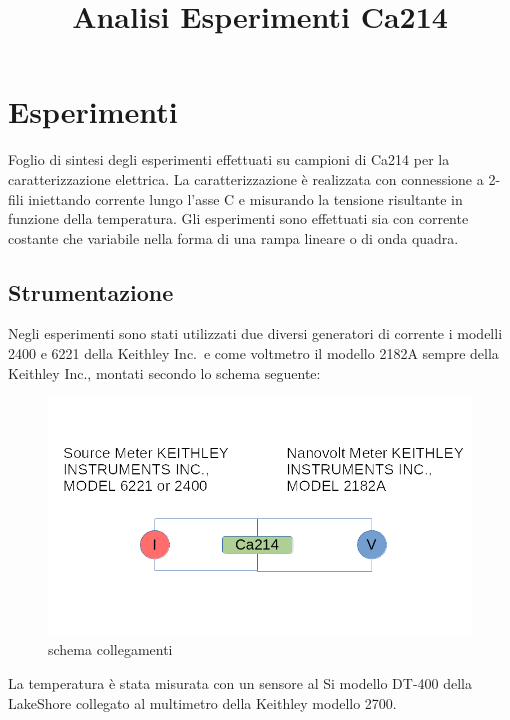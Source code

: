 \documentclass[11pt]{article}
\title{Analisi Esperimenti Ca214}
\begin{document}
    
    \maketitle
    
    

    
    \hypertarget{esperimenti}{%
\section{Esperimenti}\label{esperimenti}}

    Foglio di sintesi degli esperimenti effettuati su campioni di Ca214 per
la caratterizzazione elettrica. La caratterizzazione è realizzata con
connessione a 2-fili iniettando corrente lungo l'asse C e misurando la
tensione risultante in funzione della temperatura. Gli esperimenti sono
effettuati sia con corrente costante che variabile nella forma di una
rampa lineare o di onda quadra.

    \hypertarget{strumentazione}{%
\subsection{Strumentazione}\label{strumentazione}}

Negli esperimenti sono stati utilizzati due diversi generatori di
corrente i modelli 2400 e 6221 della Keithley Inc.~e come voltmetro il
modello 2182A sempre della Keithley Inc., montati secondo lo schema
seguente:

\begin{figure}
\centering
\includegraphics{schema_collegamenti.png}
\caption{schema collegamenti}
\end{figure}

La temperatura è stata misurata con un sensore al Si modello DT-400
della LakeShore collegato al multimetro della Keithley modello 2700.
\end{document}
